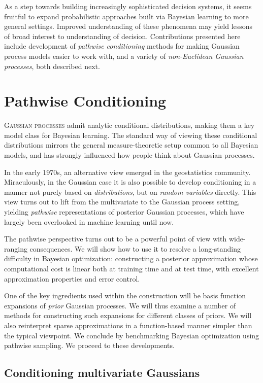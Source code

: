 \documentclass[11pt]{book}
\begin{document}
As a step towards building increasingly sophisticated decision systems, it seems fruitful to expand probabilistic approaches built via Bayesian learning to more general settings.
Improved understanding of these phenomena may yield lessons of broad interest to understanding of decision.
Contributions presented here include development of \emph{pathwise conditioning} methods for making Gaussian process models easier to work with, and a variety of \emph{non-Euclidean Gaussian processes}, both described next.


\chapter{Pathwise Conditioning}
\label{ch:pathwise}

\lettrine{G}{aussian processes} admit analytic conditional distributions, making them a key model class for Bayesian learning.
The standard way of viewing these conditional distributions mirrors the general measure-theoretic setup common to all Bayesian models, and has strongly influenced how people think about Gaussian processes.

In the early 1970s, an alternative view emerged in the geostatistics community.
Miraculously, in the Gaussian case it is also possible to develop conditioning in a manner not purely based on \emph{distributions}, but on \emph{random variables} directly.
This view turns out to lift from the multivariate to the Gaussian process setting, yielding \emph{pathwise} representations of posterior Gaussian processes, which have largely been overlooked in machine learning until now.

The pathwise perspective turns out to be a powerful point of view with wide-ranging consequences.
We will show how to use it to resolve a long-standing difficulty in Bayesian optimization: constructing a posterior approximation whose computational cost is linear both at training time and at test time, with excellent approximation properties and error control.

One of the key ingredients used within the construction will be basis function expansions of \emph{prior} Gaussian processes.
We will thus examine a number of methods for constructing such expansions for different classes of priors.
We will also reinterpret sparse approximations in a function-based manner simpler than the typical viewpoint.
We conclude by benchmarking Bayesian optimization using pathwise sampling.
We proceed to these developments.

\section{Conditioning multivariate Gaussians}
\end{document}
